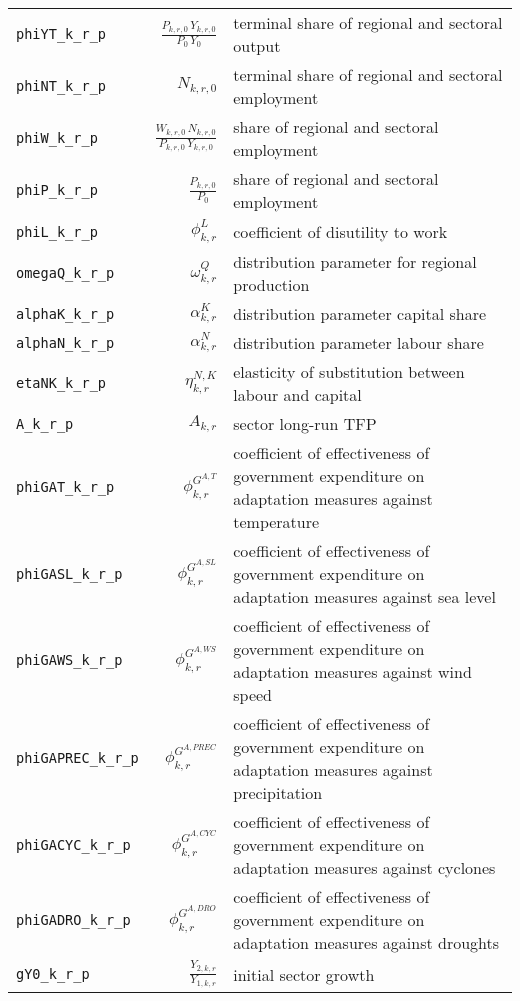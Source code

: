 \begin{center}
\begin{longtable}{lrl}
\texttt{phiYT\_k\_r\_p} & $\frac{P_{k,r,0} \, Y_{k,r,0}}{P_{0} \, Y_{0}}$ & terminal share of regional and sectoral output\\
\texttt{phiNT\_k\_r\_p} & ${N_{k,r,0}}$ & terminal share of regional and sectoral employment\\
\texttt{phiW\_k\_r\_p} & $\frac{W_{k,r,0} \, N_{k,r,0}}{P_{k,r,0} \, Y_{k,r,0}}$ & share of regional and sectoral employment\\
\texttt{phiP\_k\_r\_p} & $\frac{P_{k,r,0}}{P_{0}}$ & share of regional and sectoral employment\\
\texttt{phiL\_k\_r\_p} & ${\phi^{L}_{k,r}}$ & coefficient of disutility to work\\
\texttt{omegaQ\_k\_r\_p} & ${\omega^{Q}_{k,r}}$ & distribution parameter for regional production\\
\texttt{alphaK\_k\_r\_p} & ${\alpha^{K}_{k,r}}$ & distribution parameter capital share\\
\texttt{alphaN\_k\_r\_p} & ${\alpha^{N}_{k,r}}$ & distribution parameter labour share\\
\texttt{etaNK\_k\_r\_p} & ${\eta^{N,K}_{k,r}}$ & elasticity of substitution between labour and capital\\
\texttt{A\_k\_r\_p} & ${A_{k,r}}$ & sector long-run TFP\\
\texttt{phiGAT\_k\_r\_p} & ${\phi^{G^{A,T}}_{k,r}}$ & coefficient of effectiveness of government expenditure on adaptation measures against temperature\\
\texttt{phiGASL\_k\_r\_p} & ${\phi^{G^{A,SL}}_{k,r}}$ & coefficient of effectiveness of government expenditure on adaptation measures against sea level\\
\texttt{phiGAWS\_k\_r\_p} & ${\phi^{G^{A,WS}}_{k,r}}$ & coefficient of effectiveness of government expenditure on adaptation measures against wind speed\\
\texttt{phiGAPREC\_k\_r\_p} & ${\phi^{G^{A,PREC}}_{k,r}}$ & coefficient of effectiveness of government expenditure on adaptation measures against precipitation\\
\texttt{phiGACYC\_k\_r\_p} & ${\phi^{G^{A,CYC}}_{k,r}}$ & coefficient of effectiveness of government expenditure on adaptation measures against cyclones\\
\texttt{phiGADRO\_k\_r\_p} & ${\phi^{G^{A,DRO}}_{k,r}}$ & coefficient of effectiveness of government expenditure on adaptation measures against droughts\\
\texttt{gY0\_k\_r\_p} & ${\frac{Y_{2,k,r}}{Y_{1,k,r}}}$ & initial sector growth\\

\end{longtable}
\end{center}
